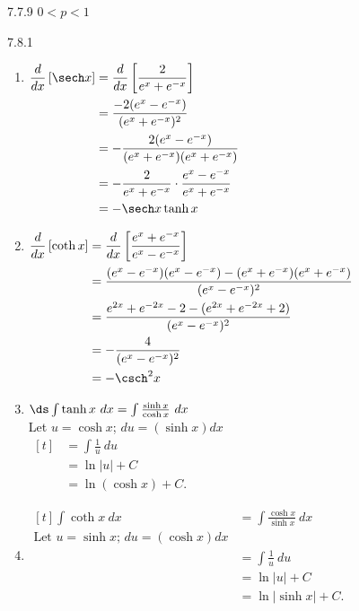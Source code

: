 \begin{Answer}{7.7.9}
		$0<p<1$
	
\end{Answer}
\begin{Answer}{7.8.1}
		\begin{enumerate}
		\item {\hfill$\begin{aligned}[t]
				\frac{d}{dx}\left[\sech x\right] &= \frac{d}{dx}\left[\frac{2}{e^x+e^{-x}}\right]  \\
													&= \frac{-2(e^x-e^{-x})}{(e^x+e^{-x})^2} \\
													&= -\frac{2(e^x-e^{-x})}{(e^x+e^{-x})(e^x+e^{-x})} \\
													&= -\frac{2}{e^x+e^{-x}}\cdot \frac{e^x-e^{-x}}{e^x+e^{-x}}\\
													&= -\sech x\tanh x
		\end{aligned}$\hfill\null}
		\item
		{\hfill$\begin{aligned}[t]
				\frac{d}{dx}\left[\coth x\right] &= \frac{d}{dx}\left[\frac{e^x+e^{-x}}{e^x-e^{-x}}\right]  \\
													&= \frac{(e^x-e^{-x})(e^x-e^{-x})-(e^x+e^{-x})(e^x+e^{-x})}{(e^x-e^{-x})^2}\\
													&= \frac{e^{2x}+e^{-2x} - 2 - (e^{2x}+e^{-2x}+2)}{(e^x-e^{-x})^2}\\
													&= -\frac{4}{(e^x-e^{-x})^2}\\
													&=-\csch^2x
		\end{aligned}$\hfill\null}
		\item {$\ds	\int \tanh x\ dx = \int \frac{\sinh x}{\cosh x}\ dx$\\
		Let $u = \cosh x$; $du = (\sinh x) dx$\\
		\hfill$\begin{aligned}[t]
													&= \int \frac{1}{u}\ du \\
													&= \ln |u| + C \\
													&= \ln (\cosh x) + C.
		\end{aligned}$\hfill\null}
		\item {\hfill$\begin{aligned}[t]
				\int \coth x\ dx &= \int \frac{\cosh x}{\sinh x}\ dx\\
													\text{Let $u = \sinh x$; $du = (\cosh x) dx$} 	\\
													&= \int \frac{1}{u}\ du \\
													&= \ln |u| + C \\
													&= \ln |\sinh x| + C.
		\end{aligned}$\hfill\null}
		\end{enumerate}
	
\end{Answer}
